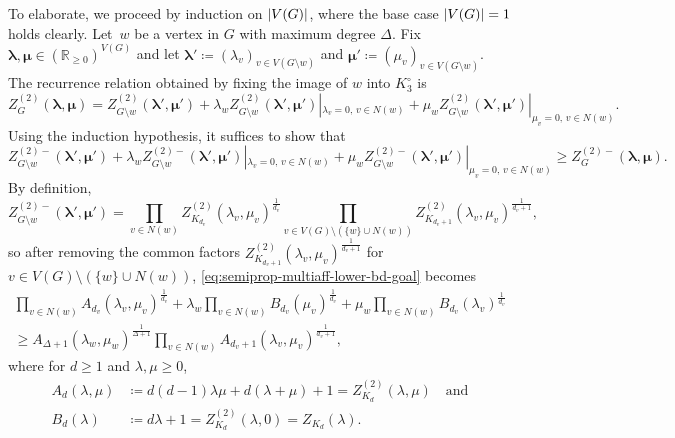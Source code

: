 \documentclass{article}
\numberwithin{equation}{section}
\theoremstyle{plain}
\theoremstyle{definition}
\theoremstyle{remark} %
\DeclarePairedDelimiter{\abs}{\lvert}{\rvert}
\newcommand{\defeq}{\coloneqq}
\newcommand{\RR}{\mathbb{R}}
\newcommand{\blambda}{\bm{\lambda}}
\newcommand{\bmu}{\bm{\mu}}
\begin{document}
To elaborate, we proceed by induction on \(\abs{V(G)}\), where the base case \(\abs{V(G)}=1\) holds clearly.
Let~\(w\) be a vertex in \(G\) with maximum degree \(\Delta\). Fix \(\blambda,\bmu\in (\RR_{\ge0})^{V(G)}\) and let \(\blambda'\defeq (\lambda_v)_{v\in V(G\setminus w)}\) and \(\bmu'\defeq (\mu_v)_{v\in V(G\setminus w)}\). The recurrence relation obtained by fixing the image of $w$ into $K_3^\circ$ is
\[
    Z^{(2)}_G(\blambda,\bmu)
    = Z^{(2)}_{G\setminus w}(\blambda',\bmu')
        + \lambda_w Z^{(2)}_{G\setminus w}(\blambda',\bmu')|_{\lambda_v=0,\, v\in N(w)}
        + \mu_w Z^{(2)}_{G\setminus w}(\blambda',\bmu')|_{\mu_v=0,\, v\in N(w)}.
\]
Using the induction hypothesis, it suffices to show that
\begin{equation}\label{eq:semiprop-multiaff-lower-bd-goal}
    Z^{(2)-}_{G\setminus w}(\blambda',\bmu')
        + \lambda_w Z^{(2)-}_{G\setminus w}(\blambda',\bmu')|_{\lambda_v=0,\, v\in N(w)}
        + \mu_w Z^{(2)-}_{G\setminus w}(\blambda',\bmu')|_{\mu_v=0,\, v\in N(w)}
    \ge Z^{(2)-}_G(\blambda,\bmu).
\end{equation}
By definition,
\[
	Z^{(2)-}_{G \setminus w}(\blambda',\bmu')
	= \prod_{v\in N(w)} Z^{(2)}_{K_{d_v}}(\lambda_v,\mu_v)^{\frac{1}{d_v}}
		\prod_{v \in V(G)\setminus (\{w\}\cup N(w))} Z^{(2)}_{K_{d_v+1}}(\lambda_v,\mu_v)^{\frac{1}{d_v+1}},
\]
so after removing the common factors \(Z^{(2)}_{K_{d_v+1}}(\lambda_v,\mu_v)^{\frac{1}{d_v+1}}\) for \(v\in V(G)\setminus (\{w\}\cup N(w))\), \eqref{eq:semiprop-multiaff-lower-bd-goal} becomes
\begin{multline}\label{eq:semiprop-multiaff-lower-bd-goal-2}
    \prod_{v\in N(w)} A_{d_v}(\lambda_v,\mu_v)^{\frac{1}{d_v}}
        + \lambda_w \prod_{v\in N(w)} B_{d_v}(\mu_v)^{\frac{1}{d_v}}
        + \mu_w \prod_{v\in N(w)} B_{d_v}(\lambda_v)^{\frac{1}{d_v}} \\
    \ge A_{\Delta+1}(\lambda_w,\mu_w)^{\frac{1}{\Delta+1}} \prod_{v\in N(w)} A_{d_v+1}(\lambda_v,\mu_v)^{\frac{1}{d_v+1}},
\end{multline}
where for \(d\ge1\) and \(\lambda,\mu\ge0\),
\begin{align*}
    A_d(\lambda,\mu) &\defeq d(d-1)\lambda\mu + d(\lambda+\mu) + 1
        = Z^{(2)}_{K_d}(\lambda,\mu)
    \quad\text{and} \\
    B_d(\lambda) &\defeq d\lambda+1
        = Z^{(2)}_{K_d}(\lambda,0) = Z_{K_d}(\lambda).
\end{align*}
\end{document}

